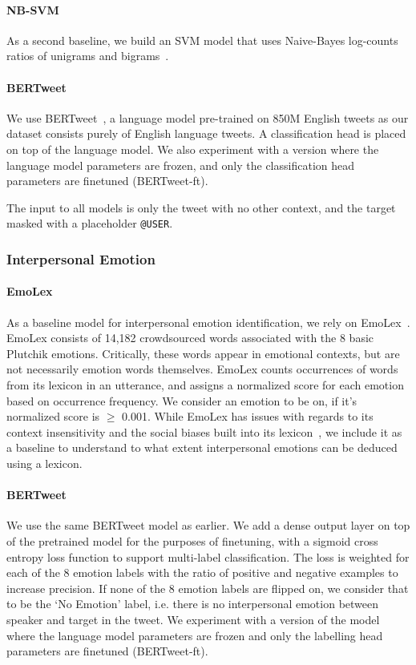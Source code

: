 \paragraph{NB-SVM} As a second baseline, we build an SVM model that uses Naive-Bayes log-counts ratios of unigrams and bigrams~\citep{wang-manning-2012-baselines}.


\paragraph{BERTweet} We use BERTweet~\citep{nguyen_bertweet_2020}, a language model pre-trained on 850M English tweets as our dataset consists purely of English language tweets. A classification head is placed on top of the language model. We also experiment with a version where the language model parameters are frozen, and only the classification head parameters are finetuned (BERTweet-ft).

The input to all models is only the tweet with no other context, and the target masked with a placeholder \texttt{@USER}.

\subsubsection{Interpersonal Emotion}

\paragraph{EmoLex} As a baseline model for interpersonal emotion identification, we rely on EmoLex~\citep{Mohammad2013CROWDSOURCINGAW}. EmoLex consists of 14,182 crowdsourced words associated with the 8 basic Plutchik emotions. Critically, these words appear in emotional contexts, but are not necessarily emotion words themselves. EmoLex counts occurrences of words from its lexicon in an utterance, and assigns a normalized score for each emotion based on occurrence frequency. We consider an emotion to be on, if it's normalized score is $\geq$ 0.001. While EmoLex has issues with regards to its context insensitivity and the social biases built into its lexicon~\citep{zad-etal-2021-hell}, we include it as a baseline to understand to what extent interpersonal emotions can be deduced using a lexicon.


\paragraph{BERTweet} We use the same BERTweet model as earlier. We add a dense output layer on top of the pretrained model for the purposes of finetuning, with a sigmoid cross entropy loss function to support multi-label classification. The loss is weighted for each of the 8 emotion labels with the ratio of positive and negative examples to increase precision. If none of the 8 emotion labels are flipped on, we consider that to be the `No Emotion' label, i.e. there is no interpersonal emotion between speaker and target in the tweet. We experiment with a version of the model where the language model parameters are frozen and only the labelling head parameters are finetuned (BERTweet-ft).

